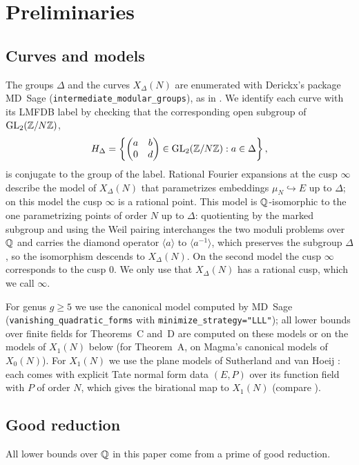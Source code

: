 \section{Preliminaries}\label{sec:prelim}

\subsection{Curves and models}
The groups $\Delta$ and the curves $X_\Delta(N)$ are enumerated with Derickx's package MD~Sage
\cite{MDSage} (\texttt{intermediate\_modular\_groups}), as in \cite{Orlic2025,DerickxOrlic2026}. We identify
each curve with its LMFDB label by checking that the corresponding open subgroup of $\operatorname{GL}_2(\mathbb{Z}/N\mathbb{Z})$,
\[
 H_\Delta=\left\{\begin{pmatrix}a&b\\0&d\end{pmatrix}\in\operatorname{GL}_2(\mathbb{Z}/N\mathbb{Z}): a\in\Delta\right\},
\]
is conjugate to the group of the label. Rational Fourier expansions at the cusp $\infty$ describe the model
of $X_\Delta(N)$ that parametrizes embeddings $\mu_N\hookrightarrow E$ up to $\Delta$; on this model the cusp $\infty$
is a rational point. This model is $\mathbb{Q}$-isomorphic to the one parametrizing points of order $N$ up to $\Delta$:
quotienting by the marked subgroup and using the Weil pairing interchanges the two moduli problems over $\mathbb{Q}$ and
carries the diamond operator $\langle a\rangle$ to $\langle a^{-1}\rangle$, which preserves the subgroup $\Delta$, so
the isomorphism descends to $X_\Delta(N)$. On the second model the cusp $\infty$ corresponds to the cusp $0$. We
only use that $X_\Delta(N)$ has a rational cusp, which we call $\infty$.

For genus $g\ge 5$ we use the canonical model computed by MD~Sage
(\texttt{vanishing\_quadratic\_forms} with \texttt{minimize\_strategy="LLL"}); all lower bounds over
finite fields for Theorems~C and~D are computed on these models or on the models of $X_1(N)$ below (for
Theorem~A, on Magma's canonical models of $X_0(N)$). For $X_1(N)$ we use the plane models
of Sutherland and van Hoeij \cite{SutherlandX1}: each comes with explicit Tate normal form data $(E,P)$ over its
function field with $P$ of order $N$, which gives the birational map to $X_1(N)$ (compare \cite{Sutherland2012}).

\subsection{Good reduction}
All lower bounds over $\mathbb{Q}$ in this paper come from a prime of good reduction.

